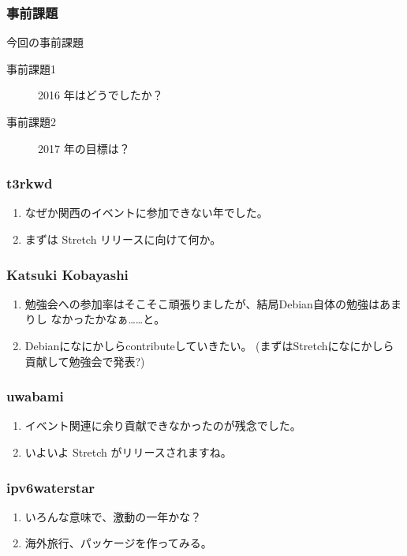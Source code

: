 \documentclass[cjk,dvipdfmx,10pt,compress,%
hyperref={bookmarks=true,bookmarksnumbered=true,bookmarksopen=false,%
colorlinks=false,%
pdftitle={第 117 回 関西 Debian 勉強会},%
pdfauthor={倉敷・のがた・佐々木・かわだ・おおつき},%
pdfsubject={資料},%
}]{beamer}
\begin{document}

\begin{frame}[fragile]
  \frametitle{事前課題}
  \begin{block}{今回の事前課題}
    \begin{description}
    \item[事前課題1]
      2016 年はどうでしたか？
    \item[事前課題2]
      2017 年の目標は？
    \end{description}
  \end{block}
\end{frame}


\begin{frame}
  \frametitle{ t3rkwd }
  \begin{enumerate}
  \item なぜか関西のイベントに参加できない年でした。
  \item まずは Stretch リリースに向けて何か。
  \end{enumerate}
\end{frame}

\begin{frame}
  \frametitle{ Katsuki Kobayashi }
  \begin{enumerate}
  \item 勉強会への参加率はそこそこ頑張りましたが、結局Debian自体の勉強はあまりし
    なかったかなぁ……と。
  \item Debianになにかしらcontributeしていきたい。
    (まずはStretchになにかしら貢献して勉強会で発表?)
  \end{enumerate}
\end{frame}

\begin{frame}
  \frametitle{ uwabami }
  \begin{enumerate}
  \item イベント関連に余り貢献できなかったのが残念でした。
  \item いよいよ Stretch がリリースされますね。
  \end{enumerate}
\end{frame}

\begin{frame}
  \frametitle{ ipv6waterstar }
  \begin{enumerate}
  \item いろんな意味で、激動の一年かな？
  \item 海外旅行、パッケージを作ってみる。
  \end{enumerate}
\end{frame}
\end{document}
